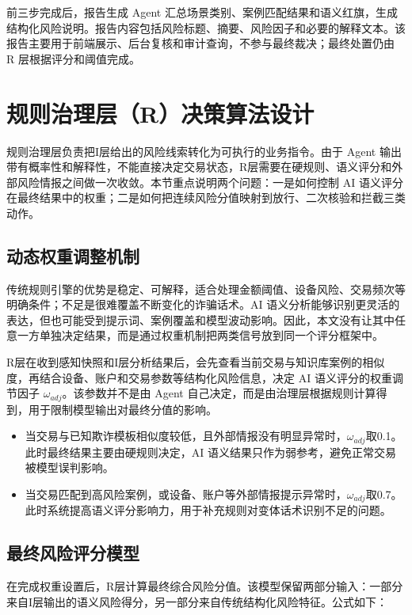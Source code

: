 \documentclass{xduugthesis}
\begin{document}
前三步完成后，报告生成 Agent 汇总场景类别、案例匹配结果和语义红旗，生成结构化风险说明。报告内容包括风险标题、摘要、风险因子和必要的解释文本。该报告主要用于前端展示、后台复核和审计查询，不参与最终裁决；最终处置仍由 R 层根据评分和阈值完成。


\section{规则治理层（R）决策算法设计}

规则治理层负责把I层给出的风险线索转化为可执行的业务指令。由于 Agent 输出带有概率性和解释性，不能直接决定交易状态，R层需要在硬规则、语义评分和外部风险情报之间做一次收敛。本节重点说明两个问题：一是如何控制 AI 语义评分在最终结果中的权重；二是如何把连续风险分值映射到放行、二次核验和拦截三类动作。

\subsection{动态权重调整机制}

传统规则引擎的优势是稳定、可解释，适合处理金额阈值、设备风险、交易频次等明确条件；不足是很难覆盖不断变化的诈骗话术。AI 语义分析能够识别更灵活的表达，但也可能受到提示词、案例覆盖和模型波动影响\cite{haeri2025riskembed}。因此，本文没有让其中任意一方单独决定结果，而是通过权重机制把两类信号放到同一个评分框架中。

R层在收到感知快照和I层分析结果后，会先查看当前交易与知识库案例的相似度，再结合设备、账户和交易参数等结构化风险信息，决定 AI 语义评分的权重调节因子 $\omega_{adj}$。该参数并不是由 Agent 自己决定，而是由治理层根据规则计算得到，用于限制模型输出对最终分值的影响。

\begin{itemize}
    \item 当交易与已知欺诈模板相似度较低，且外部情报没有明显异常时，$\omega_{adj}$取0.1。此时最终结果主要由硬规则决定，AI 语义结果只作为弱参考，避免正常交易被模型误判影响。
    \item 当交易匹配到高风险案例，或设备、账户等外部情报提示异常时，$\omega_{adj}$取0.7。此时系统提高语义评分影响力，用于补充规则对变体话术识别不足的问题。
\end{itemize}

\subsection{最终风险评分模型}

在完成权重设置后，R层计算最终综合风险分值。该模型保留两部分输入：一部分来自I层输出的语义风险得分，另一部分来自传统结构化风险特征。公式如下：
\end{document}
